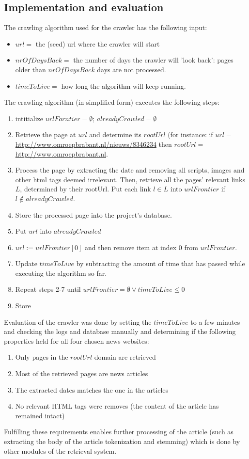 \subsection*{Implementation and evaluation}
The crawling algorithm used for the crawler has the following input:
\begin{itemize}[noitemsep]
\item $url = $ the (seed) url where the crawler will start
\item $nrOfDaysBack = $ the number of days the crawler will 'look back': pages older than $nrOfDaysBack$ days are not processed.
\item $timeToLive = $ how long the algorithm will keep running.
\end{itemize}
The crawling algorithm (in simplified form) executes the following steps:
\begin{enumerate}
\item intitialize $urlForntier = \emptyset$; $alreadyCrawled = \emptyset$
\item Retrieve the page at $url$ and determine its $rootUrl$ (for instance: if $url = $\url{http://www.omroepbrabant.nl/nieuws/8346234} then $rootUrl = $\url{http://www.omroepbrabant.nl}.
\item Process the page by extracting the date and removing all scripts, images and other html tags deemed irrelevant. Then, retrieve all the pages' relevant links $L$, determined by their rootUrl. Put each link $l \in L$ into $urlFrontier$ if $l \not\in alreadyCrawled$. 
\item Store the processed page into the project's database.
\item Put $url$ into $alreadyCrawled$
\item $url := urlFrontier[0]$ and then remove item at index 0 from $urlFrontier$.
\item Update $timeToLive$ by subtracting the amount of time that has passed while executing the algorithm so far.
\item Repeat steps 2-7 until $urlFrontier = \emptyset \vee timeToLive \le 0$
\item Store 
\end{enumerate}
Evaluation of the crawler was done by setting the $timeToLive$ to a few minutes and checking the logs and database manually and determining if the following properties held for all four chosen news websites:
\begin{enumerate}
\item Only pages in the $rootUrl$ domain are retrieved
\item Most of the retrieved pages are news articles
\item The extracted dates matches the one in the articles
\item No relevant HTML tags were removes (the content of the article has remained intact)
\end{enumerate}
Fulfilling these requirements enables further processing of the article (such as extracting the body of the article tokenization and stemming) which is done by other modules of the retrieval system.